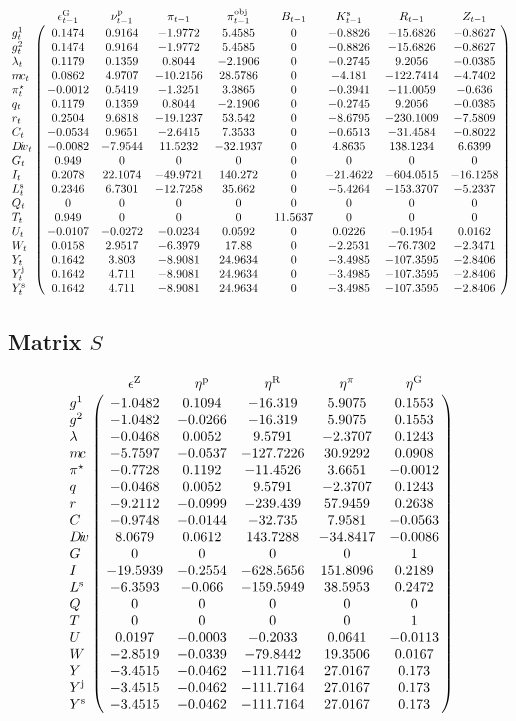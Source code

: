 $$\bordermatrix{
~ & \epsilon^{\mathrm{G}}_{t-1} & \nu^{\mathrm{p}}_{t-1} & \pi_{t-1} & \pi^{\mathrm{obj}}_{t-1} & B_{t-1} & K^{\mathrm{s}}_{t-1} & R_{t-1} & Z_{t-1} \cr
g^{\mathrm{1}}_{t} & 0.1474 & 0.9164 & -1.9772 & 5.4585 & 0 & -0.8826 & -15.6826 & -0.8627 \cr
g^{\mathrm{2}}_{t} & 0.1474 & 0.9164 & -1.9772 & 5.4585 & 0 & -0.8826 & -15.6826 & -0.8627 \cr
\lambda_{t} & 0.1179 & 0.1359 & 0.8044 & -2.1906 & 0 & -0.2745 & 9.2056 & -0.0385 \cr
{m\!c}_{t} & 0.0862 & 4.9707 & -10.2156 & 28.5786 & 0 & -4.181 & -122.7414 & -4.7402 \cr
\pi^{\star}_{t} & -0.0012 & 0.5419 & -1.3251 & 3.3865 & 0 & -0.3941 & -11.0059 & -0.636 \cr
q_{t} & 0.1179 & 0.1359 & 0.8044 & -2.1906 & 0 & -0.2745 & 9.2056 & -0.0385 \cr
r_{t} & 0.2504 & 9.6818 & -19.1237 & 53.542 & 0 & -8.6795 & -230.1009 & -7.5809 \cr
C_{t} & -0.0534 & 0.9651 & -2.6415 & 7.3533 & 0 & -0.6513 & -31.4584 & -0.8022 \cr
{D\!i\!v}_{t} & -0.0082 & -7.9544 & 11.5232 & -32.1937 & 0 & 4.8635 & 138.1234 & 6.6399 \cr
G_{t} & 0.949 & 0 & 0 & 0 & 0 & 0 & 0 & 0 \cr
I_{t} & 0.2078 & 22.1074 & -49.9721 & 140.272 & 0 & -21.4622 & -604.0515 & -16.1258 \cr
L^{\mathrm{s}}_{t} & 0.2346 & 6.7301 & -12.7258 & 35.662 & 0 & -5.4264 & -153.3707 & -5.2337 \cr
Q_{t} & 0 & 0 & 0 & 0 & 0 & 0 & 0 & 0 \cr
T_{t} & 0.949 & 0 & 0 & 0 & 11.5637 & 0 & 0 & 0 \cr
U_{t} & -0.0107 & -0.0272 & -0.0234 & 0.0592 & 0 & 0.0226 & -0.1954 & 0.0162 \cr
W_{t} & 0.0158 & 2.9517 & -6.3979 & 17.88 & 0 & -2.2531 & -76.7302 & -2.3471 \cr
Y_{t} & 0.1642 & 3.803 & -8.9081 & 24.9634 & 0 & -3.4985 & -107.3595 & -2.8406 \cr
Y^{\mathrm{j}}_{t} & 0.1642 & 4.711 & -8.9081 & 24.9634 & 0 & -3.4985 & -107.3595 & -2.8406 \cr
Y^{\mathrm{s}}_{t} & 0.1642 & 4.711 & -8.9081 & 24.9634 & 0 & -3.4985 & -107.3595 & -2.8406 \cr
}$$

\subsection*{Matrix $S$}

$$\bordermatrix{
~ & \epsilon^{\mathrm{Z}} & \eta^{\mathrm{p}} & \eta^{\mathrm{R}} & \eta^{\pi} & \eta^{\mathrm{G}} \cr
g^{\mathrm{1}} & -1.0482 & 0.1094 & -16.319 & 5.9075 & 0.1553 \cr
g^{\mathrm{2}} & -1.0482 & -0.0266 & -16.319 & 5.9075 & 0.1553 \cr
\lambda & -0.0468 & 0.0052 & 9.5791 & -2.3707 & 0.1243 \cr
{m\!c} & -5.7597 & -0.0537 & -127.7226 & 30.9292 & 0.0908 \cr
\pi^{\star} & -0.7728 & 0.1192 & -11.4526 & 3.6651 & -0.0012 \cr
q & -0.0468 & 0.0052 & 9.5791 & -2.3707 & 0.1243 \cr
r & -9.2112 & -0.0999 & -239.439 & 57.9459 & 0.2638 \cr
C & -0.9748 & -0.0144 & -32.735 & 7.9581 & -0.0563 \cr
{D\!i\!v} & 8.0679 & 0.0612 & 143.7288 & -34.8417 & -0.0086 \cr
G & 0 & 0 & 0 & 0 & 1 \cr
I & -19.5939 & -0.2554 & -628.5656 & 151.8096 & 0.2189 \cr
L^{\mathrm{s}} & -6.3593 & -0.066 & -159.5949 & 38.5953 & 0.2472 \cr
Q & 0 & 0 & 0 & 0 & 0 \cr
T & 0 & 0 & 0 & 0 & 1 \cr
U & 0.0197 & -0.0003 & -0.2033 & 0.0641 & -0.0113 \cr
W & -2.8519 & -0.0339 & -79.8442 & 19.3506 & 0.0167 \cr
Y & -3.4515 & -0.0462 & -111.7164 & 27.0167 & 0.173 \cr
Y^{\mathrm{j}} & -3.4515 & -0.0462 & -111.7164 & 27.0167 & 0.173 \cr
Y^{\mathrm{s}} & -3.4515 & -0.0462 & -111.7164 & 27.0167 & 0.173 \cr
}$$


